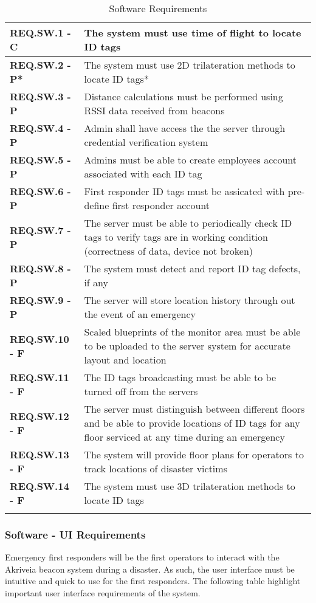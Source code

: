 \bgroup
\def\arraystretch{1.5}
\begin{longtable}[H]{ | m{3.5cm} | m{12.5cm} |} 
 \hline
 \textbf{REQ.SW.1 - C} & The system must use time of flight to locate ID tags \\ 
\hline
 \textbf{REQ.SW.2 - P*} & The system must use 2D trilateration methods to locate ID tags* \\ 
\hline
 \textbf{REQ.SW.3 - P} & Distance calculations must be performed using RSSI data received from beacons \\ 
\hline
 \textbf{REQ.SW.4 - P} & Admin shall have access the the server through credential verification system \\
\hline
 \textbf{REQ.SW.5 - P} & Admins must be able to create employees account associated with each ID tag \\
\hline
 \textbf{REQ.SW.6 - P} & First responder ID tags must be assicated with pre-define first responder account \\
\hline
 \textbf{REQ.SW.7 - P} & The server must be able to periodically check ID tags to verify tags are in working condition (correctness of data, device not broken) \\
\hline
 \textbf{REQ.SW.8 - P} & The system must detect and report ID tag defects, if any \\
\hline
 \textbf{REQ.SW.9 - P} & The server will store location history through out the event of an emergency \\
\hline
 \textbf{REQ.SW.10 - F} & Scaled blueprints of the monitor area must be able to be uploaded to the server system for accurate layout and location \\
\hline
 \textbf{REQ.SW.11 - F} & The ID tags broadcasting must be able to be turned off from the servers \\
\hline
 \textbf{REQ.SW.12 - F} & The server must distinguish between different floors and be able to provide locations of ID tags for any floor serviced at any time during an emergency \\
\hline
 \textbf{REQ.SW.13 - F} & The system will provide floor plans for operators to track locations of disaster victims \\
\hline
 \textbf{REQ.SW.14 - F} & The system must use 3D trilateration methods to locate ID tags \\
\hline
\caption{Software Requirements}
\end{longtable}	

\break
\subsubsection{Software - UI Requirements}
\bigskip
Emergency first responders will be the first operators to interact with the Akriveia beacon system during a disaster. As such, the user interface must be intuitive and quick to use for the first responders. The following table highlight important user interface requirements of the system.
\bigskip

